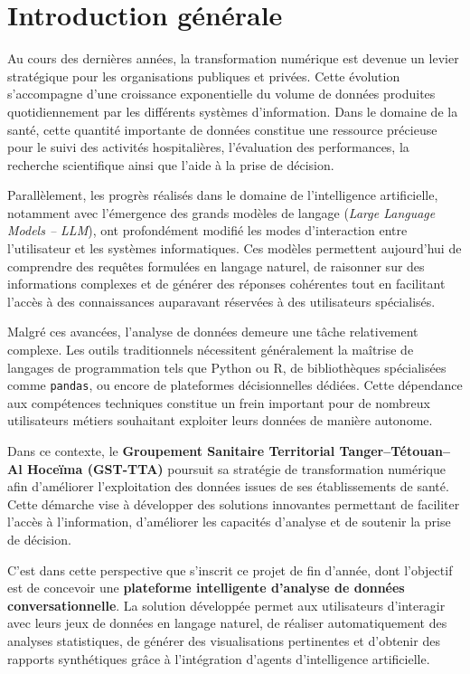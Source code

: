 \chapter{Introduction générale}

Au cours des dernières années, la transformation numérique est devenue un levier stratégique pour les organisations publiques et privées. Cette évolution s'accompagne d'une croissance exponentielle du volume de données produites quotidiennement par les différents systèmes d'information. Dans le domaine de la santé, cette quantité importante de données constitue une ressource précieuse pour le suivi des activités hospitalières, l'évaluation des performances, la recherche scientifique ainsi que l'aide à la prise de décision.

Parallèlement, les progrès réalisés dans le domaine de l'intelligence artificielle, notamment avec l'émergence des grands modèles de langage (\textit{Large Language Models -- LLM}), ont profondément modifié les modes d'interaction entre l'utilisateur et les systèmes informatiques. Ces modèles permettent aujourd'hui de comprendre des requêtes formulées en langage naturel, de raisonner sur des informations complexes et de générer des réponses cohérentes tout en facilitant l'accès à des connaissances auparavant réservées à des utilisateurs spécialisés.

Malgré ces avancées, l'analyse de données demeure une tâche relativement complexe. Les outils traditionnels nécessitent généralement la maîtrise de langages de programmation tels que Python ou R, de bibliothèques spécialisées comme \texttt{pandas}, ou encore de plateformes décisionnelles dédiées. Cette dépendance aux compétences techniques constitue un frein important pour de nombreux utilisateurs métiers souhaitant exploiter leurs données de manière autonome.

Dans ce contexte, le \textbf{Groupement Sanitaire Territorial Tanger--Tétouan--Al Hoceïma (GST-TTA)} poursuit sa stratégie de transformation numérique afin d'améliorer l'exploitation des données issues de ses établissements de santé. Cette démarche vise à développer des solutions innovantes permettant de faciliter l'accès à l'information, d'améliorer les capacités d'analyse et de soutenir la prise de décision.

C'est dans cette perspective que s'inscrit ce projet de fin d'année, dont l'objectif est de concevoir une \textbf{plateforme intelligente d'analyse de données conversationnelle}. La solution développée permet aux utilisateurs d'interagir avec leurs jeux de données en langage naturel, de réaliser automatiquement des analyses statistiques, de générer des visualisations pertinentes et d'obtenir des rapports synthétiques grâce à l'intégration d'agents d'intelligence artificielle.


